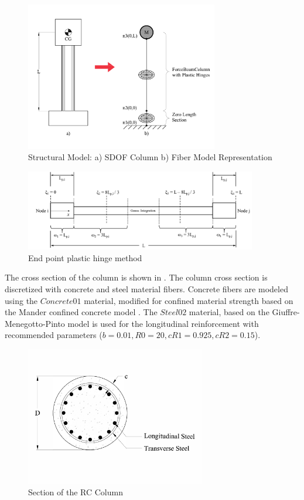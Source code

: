\begin{figure}[htbp]
	\centering
	\includegraphics[width=0.75\textwidth]{Chapter-5/figs/StructuralModel_01}
	\caption{Structural Model: a) SDOF Column b) Fiber Model Representation}
	\label{fig:Structural_Model}
\end{figure}

\begin{figure}[htbp]
	\centering
	\includegraphics[width=0.9\textwidth]{Chapter-5/figs/fbc_PlasticHinge}
	\caption{End point plastic hinge method \cite{Scott}}
	\label{fig:Fiber_PlasticHinge}
\end{figure}

The cross section of the column is shown in . The column cross section is discretized with concrete and steel material fibers. Concrete fibers are modeled using the $Concrete01$ material, modified for confined material strength based on the Mander confined concrete model \cite{Mander1988}. The $Steel02$ material, based on the Giuffre-Menegotto-Pinto model \cite{Filippou1983} is used for the longitudinal reinforcement with recommended parameters ($b = 0.01, R0 = 20, cR1 = 0.925, cR2 = 0.15$). 

\begin{figure}[htbp]
	\centering
	\includegraphics[width=0.7\textwidth]{Chapter-5/figs/StructuralModel_Section}
	\caption{Section of the RC Column}
	\label{fig:ColumnSection}
\end{figure}
